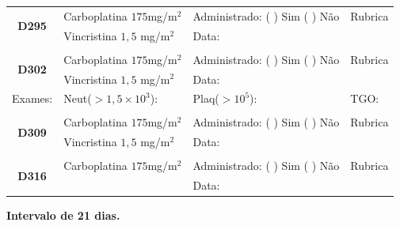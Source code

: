 \documentclass[11pt,a4paper,oldfontcommands]{memoir}
\begin{document}
\begin{center}
\begin{longtable}{p{1cm}p{4cm}|p{5cm}|p{3cm}}
    \hline
    \multicolumn{1}{c|}{\multirow{2}{*}{\textbf{D295}}}&{Carboplatina \(175\)mg/m\(^2\)}&{Administrado: (  ) Sim (  ) Não}&{Rubrica}\\
    \multicolumn{1}{c|}{}&{Vincristina \(1,5\) mg/m\(^2\)}&{Data:}&\\
    \hline
    \\
    \hline
    \multicolumn{1}{c|}{\multirow{2}{*}{\textbf{D302}}}&{Carboplatina \(175\)mg/m\(^2\)}&{Administrado: (  ) Sim (  ) Não}&{Rubrica}\\
    \multicolumn{1}{c|}{}&{Vincristina \(1,5\) mg/m\(^2\)}&{Data:}&\\
    \hline
    {\tiny{Exames:}}&{\tiny{Neut(\(>1,5\times10^3\)):}}&{\tiny{Plaq(\(>10^5\)):}}&{\tiny{TGO:}}
    \\
    \hline
    \\
    \hline
    \multicolumn{1}{c|}{\multirow{2}{*}{\textbf{D309}}}&{Carboplatina \(175\)mg/m\(^2\)}&{Administrado: (  ) Sim (  ) Não}&{Rubrica}\\
    \multicolumn{1}{c|}{}&{Vincristina \(1,5\) mg/m\(^2\)}&{Data:}&\\
    \hline
    \\
    \hline
    \multicolumn{1}{c|}{\multirow{2}{*}{\textbf{D316}}}&{Carboplatina \(175\)mg/m\(^2\)}&{Administrado: (  ) Sim (  ) Não}&{Rubrica}\\
	\multicolumn{1}{c|}{}&&{Data:}&\\
    \hline
\end{longtable}
\textbf{Intervalo de 21 dias.}
\end{center}
\end{document}
